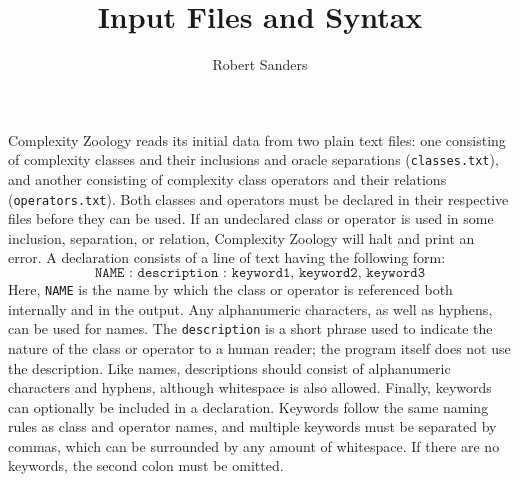 \documentclass[12pt]{amsart}
\title{Input Files and Syntax}
\date{}
\author{Robert Sanders}
\theoremstyle{definition}
\theoremstyle{remark}
\begin{document}
\maketitle

Complexity Zoology reads its initial data from two plain text files: one
consisting of complexity classes and their inclusions and oracle separations
(\texttt{classes.txt}), and another consisting of complexity class operators
and their relations (\texttt{operators.txt}). Both classes and operators must be
declared in their respective files before they can be used. If an undeclared
class or operator is used in some inclusion, separation, or relation, Complexity
Zoology will halt and print an error. A declaration consists of a line of text
having the following form:
\[
\texttt{NAME : description : keyword1, keyword2, keyword3}
\]
Here, \texttt{NAME} is the name by which the class or operator is referenced
both internally and in the output. Any alphanumeric characters, as well as
hyphens, can be used for names. The \texttt{description} is a short phrase
used to indicate the nature of the class or operator to a human reader; the
program itself does not use the description. Like names, descriptions should
consist of alphanumeric characters and hyphens, although whitespace is also
allowed. Finally, keywords can optionally be included in a declaration.
Keywords follow the same naming rules as class and operator names, and multiple
keywords must be separated by commas, which can be surrounded by any amount of
whitespace. If there are no keywords, the second colon must be omitted.
\end{document}
